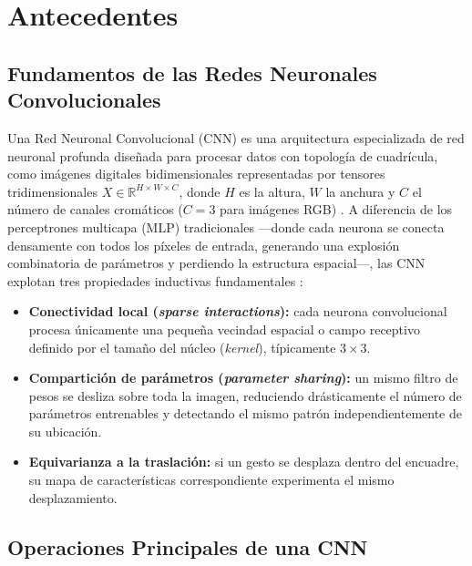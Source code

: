 \section{Antecedentes}

\subsection{Fundamentos de las Redes Neuronales Convolucionales}

Una Red Neuronal Convolucional (CNN) es una arquitectura especializada de red neuronal profunda diseñada para procesar datos con topología de cuadrícula, como imágenes digitales bidimensionales representadas por tensores tridimensionales $X \in \mathbb{R}^{H \times W \times C}$, donde $H$ es la altura, $W$ la anchura y $C$ el número de canales cromáticos ($C = 3$ para imágenes RGB) \cite{Goodfellow2016}. A diferencia de los perceptrones multicapa (MLP) tradicionales —donde cada neurona se conecta densamente con todos los píxeles de entrada, generando una explosión combinatoria de parámetros y perdiendo la estructura espacial—, las CNN explotan tres propiedades inductivas fundamentales \cite{LeCun1998}:

\begin{itemize}
    \item \textbf{Conectividad local (\textit{sparse interactions}):} cada neurona convolucional procesa únicamente una pequeña vecindad espacial o campo receptivo definido por el tamaño del núcleo (\textit{kernel}), típicamente $3 \times 3$.
    \item \textbf{Compartición de parámetros (\textit{parameter sharing}):} un mismo filtro de pesos se desliza sobre toda la imagen, reduciendo drásticamente el número de parámetros entrenables y detectando el mismo patrón independientemente de su ubicación.
    \item \textbf{Equivarianza a la traslación:} si un gesto se desplaza dentro del encuadre, su mapa de características correspondiente experimenta el mismo desplazamiento.
\end{itemize}

\subsection{Operaciones Principales de una CNN}

